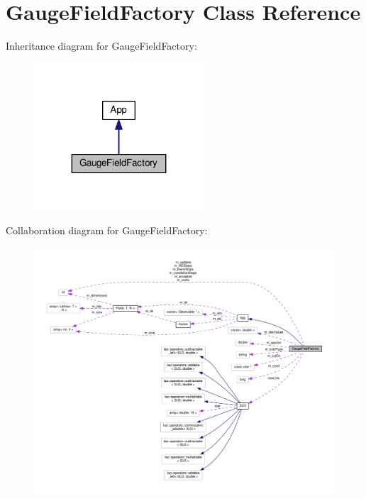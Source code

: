\hypertarget{classGaugeFieldFactory}{}\section{Gauge\+Field\+Factory Class Reference}
\label{classGaugeFieldFactory}


Inheritance diagram for Gauge\+Field\+Factory\+:\nopagebreak
\begin{figure}[H]
\begin{center}
\leavevmode
\includegraphics[width=179pt]{da/deb/classGaugeFieldFactory__inherit__graph}
\end{center}
\end{figure}


Collaboration diagram for Gauge\+Field\+Factory\+:
\nopagebreak
\begin{figure}[H]
\begin{center}
\leavevmode
\includegraphics[width=350pt]{df/dd0/classGaugeFieldFactory__coll__graph}
\end{center}
\end{figure}
